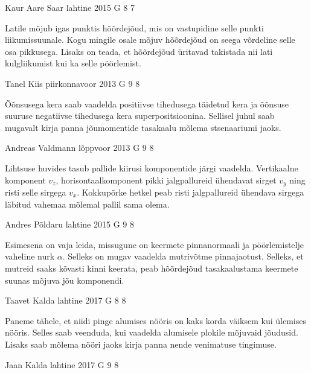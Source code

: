 \documentclass[11pt, twoside]{article}
\begin{document}
{%
{Kaur Aare Saar} %
{lahtine} %
{2015} %
{G 8} %
{7} %
{

\ifHint
Latile mõjub igas punktis hõõrdejõud, mis on vastupidine selle punkti liikumissuunale. Kogu mingile osale mõjuv hõõrdejõud on seega võrdeline selle osa pikkusega. Lisaks on teada, et hõõrdejõud üritavad takistada nii lati kulgliikumist kui ka selle pöörlemist.
\fi
}

{Tanel Kiis} %
{piirkonnavoor} %
{2013} %
{G 9} %
{8} %
{

\ifHint
Õõnsusega kera saab vaadelda positiivse tihedusega täidetud kera ja õõnsuse suuruse negatiivse tihedusega kera superpositsioonina. Sellisel juhul saab mugavalt kirja panna jõumomentide tasakaalu mõlema stsenaariumi jaoks.
\fi
}

{Andreas Valdmann} %
{lõppvoor} %
{2013} %
{G 9} %
{8} %
{

\ifHint
Lihtsuse huvides tasub pallide kiirusi komponentide järgi vaadelda. Vertikaalne komponent $v_z$, horisontaalkomponent pikki jalgpallureid ühendavat sirget $v_y$ ning risti selle sirgega $v_x$. Kokkupõrke hetkel peab risti jalgpallureid ühendava sirgega läbitud vahemaa mõlemal pallil sama olema.
\fi
}

{Andres Põldaru} %
{lahtine} %
{2015} %
{G 9} %
{8} %
{

\ifHint
Esimesena on vaja leida, missugune on keermete pinnanormaali ja pöörlemistelje vaheline nurk $\alpha$. Selleks on mugav vaadelda mutrivõtme pinnajaotust. Selleks, et mutreid saaks kõvasti kinni keerata, peab hõõrdejõud tasakaalustama keermete suunas mõjuva jõu komponendi.
\fi
}

{Taavet Kalda} %
{lahtine} %
{2017} %
{G 8} %
{8} %
{

\ifHint
Paneme tähele, et niidi pinge alumises nööris on kaks korda väiksem kui ülemises nööris. Selles saab veenduda, kui vaadelda alumisele plokile mõjuvaid jõudusid. Lisaks saab mõlema nööri jaoks kirja panna nende venimatuse tingimuse.
\fi
}

{Jaan Kalda} %
{lahtine} %
{2017} %
{G 9} %
{8} %
{

}}
\end{document}
